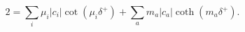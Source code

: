 \begin{equation} 
\label{delta-+}
2 =
\sum_i \mu_i |c_i| \cot(\mu_i  \delta^+) + 
\sum_a m_a |c_a| \coth(m_a  \delta^+).
\end{equation}

